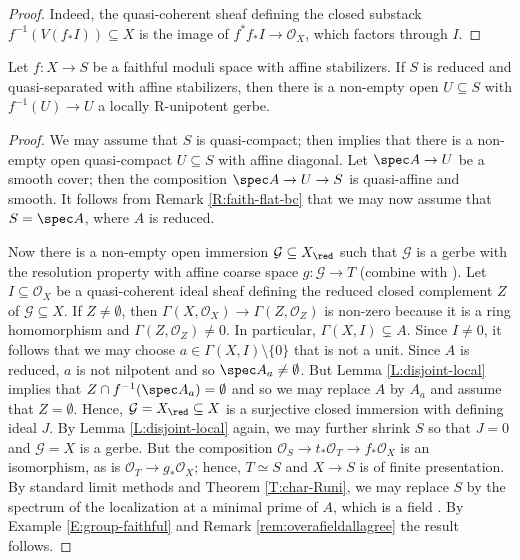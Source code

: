 \documentclass[reqno,a4paper]{amsart}
\numberwithin{Theorem}{section}
\newcommand{\Orb}{\mathcal{O}}
\theoremstyle{plain}
\theoremstyle{remark}
\newcommand{\spref}[1]{\href{https://stacks.math.columbia.edu/tag/#1}{#1}}
\begin{document}
\begin{proof}
  Indeed, the quasi-coherent sheaf defining the closed substack $f^{-1}(V(f_*I)) \subseteq X$ is the
  image of $f^*f_*I \to \Orb_X$, which factors through $I$. 
\end{proof}
\begin{proposition}\label{P:faithful-generic-gerbe}
  Let $f \colon X \to S$ be a faithful moduli space with affine
  stabilizers. If $S$ is reduced and quasi-separated with affine stabilizers, then there is a
  non-empty open $U \subseteq S$ with $f^{-1}(U) \to U$ a locally
  R-unipotent gerbe.
\end{proposition}
\begin{proof}
  We may assume that $S$ is quasi-compact; then
  \cite[Prop.~2.6(i)]{hallj_dary_alg_groups_classifying} implies that
  there is a non-empty open quasi-compact $U \subseteq S$ with affine
  diagonal. Let $\spec A \to U$ be a smooth cover; then the
  composition $\spec A \to U \to S$ is quasi-affine and smooth. It
  follows from Remark \ref{R:faith-flat-bc} that we may now assume
  that $S=\spec A$, where $A$ is reduced.

  Now there is a non-empty open immersion
  $\mathcal{G} \subseteq X_{\red}$ such that $\mathcal{G}$ is a gerbe
  with the resolution property with affine coarse space
  $g \colon \mathcal{G} \to T$ (combine \cite[Tags \spref{06RC} \&
  \spref{06NH}]{stacks-project} with \cite[Prop.\
  2.6(i)]{hallj_dary_alg_groups_classifying}).  Let
  $I \subseteq \Orb_X$ be a quasi-coherent ideal sheaf defining the
  reduced closed complement $Z$ of $\mathcal{G} \subseteq X$. If
  $Z\neq \emptyset$, then $\Gamma(X,\Orb_X) \to \Gamma(Z,\Orb_Z)$ is
  non-zero because it is a ring homomorphism and
  $\Gamma(Z,\Orb_Z) \neq 0$. In particular,
  $\Gamma(X,I) \subsetneq A$. Since $I\neq 0$, it follows that we may
  choose $a \in \Gamma(X,I)\setminus \{0\}$ that is not a unit. Since
  $A$ is reduced, $a$ is not nilpotent and so
  $\spec A_a \neq \emptyset$. But Lemma \ref{L:disjoint-local} implies
  that $Z \cap f^{-1}(\spec A_a)=\emptyset$ and so we may replace $A$
  by $A_a$ and assume that $Z=\emptyset$. Hence, 
  $\mathcal{G} =X_{\red}\subseteq X$ is a surjective closed immersion
  with defining ideal $J$. By Lemma \ref{L:disjoint-local} again, we
  may further shrink $S$ so that $J=0$ and $\mathcal{G} = X$ is a
  gerbe.  But the composition $\Orb_S \to t_*\Orb_T \to f_*\Orb_X$ is
  an isomorphism, as is $\Orb_T \to g_*\Orb_X$; hence, $T \simeq S$
  and $X \to S$ is of finite presentation. By standard limit methods
  and Theorem \ref{T:char-Runi}, we may replace $S$ by the spectrum of
  the localization at a minimal prime of $A$, which is a field \cite[Tag \spref{00EU}]{stacks-project}. By Example
  \ref{E:group-faithful} and 
Remark \ref{rem:overafieldallagree} the result follows.
\end{proof}
\end{document}
